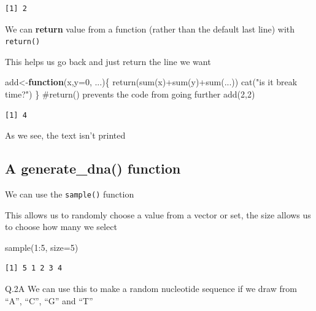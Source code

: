 \documentclass[
  letterpaper,
  DIV=11,
  numbers=noendperiod]{scrartcl}
\newenvironment{Shaded}{\begin{snugshade}}{\end{snugshade}}
\newcommand{\AttributeTok}[1]{\textcolor[rgb]{0.40,0.45,0.13}{#1}}
\newcommand{\CommentTok}[1]{\textcolor[rgb]{0.37,0.37,0.37}{#1}}
\newcommand{\ControlFlowTok}[1]{\textcolor[rgb]{0.00,0.23,0.31}{\textbf{#1}}}
\newcommand{\DecValTok}[1]{\textcolor[rgb]{0.68,0.00,0.00}{#1}}
\newcommand{\FunctionTok}[1]{\textcolor[rgb]{0.28,0.35,0.67}{#1}}
\newcommand{\NormalTok}[1]{\textcolor[rgb]{0.00,0.23,0.31}{#1}}
\newcommand{\OtherTok}[1]{\textcolor[rgb]{0.00,0.23,0.31}{#1}}
\newcommand{\SpecialCharTok}[1]{\textcolor[rgb]{0.37,0.37,0.37}{#1}}
\newcommand{\StringTok}[1]{\textcolor[rgb]{0.13,0.47,0.30}{#1}}
\begin{document}
\begin{verbatim}
[1] 2
\end{verbatim}

We can \textbf{return} value from a function (rather than the default
last line) with \texttt{return()}

This helps us go back and just return the line we want

\begin{Shaded}
\begin{Highlighting}[]
\NormalTok{add}\OtherTok{\textless{}{-}}\ControlFlowTok{function}\NormalTok{(x,}\AttributeTok{y=}\DecValTok{0}\NormalTok{, ...)\{}
  \FunctionTok{return}\NormalTok{(}\FunctionTok{sum}\NormalTok{(x)}\SpecialCharTok{+}\FunctionTok{sum}\NormalTok{(y)}\SpecialCharTok{+}\FunctionTok{sum}\NormalTok{(...))}
  \FunctionTok{cat}\NormalTok{(}\StringTok{"is it break time?"}\NormalTok{)}
\NormalTok{\}}
\CommentTok{\#return() prevents the code from going further}
\FunctionTok{add}\NormalTok{(}\DecValTok{2}\NormalTok{,}\DecValTok{2}\NormalTok{)}
\end{Highlighting}
\end{Shaded}

\begin{verbatim}
[1] 4
\end{verbatim}

As we see, the text isn't printed

\subsection{A generate\_dna() function}\label{a-generate_dna-function}

We can use the \texttt{sample()} function

This allows us to randomly choose a value from a vector or set, the size
allows us to choose how many we select

\begin{Shaded}
\begin{Highlighting}[]
\FunctionTok{sample}\NormalTok{(}\DecValTok{1}\SpecialCharTok{:}\DecValTok{5}\NormalTok{, }\AttributeTok{size=}\DecValTok{5}\NormalTok{)}
\end{Highlighting}
\end{Shaded}

\begin{verbatim}
[1] 5 1 2 3 4
\end{verbatim}

Q.2A We can use this to make a random nucleotide sequence if we draw
from ``A'', ``C'', ``G'' and ``T''
\end{document}
